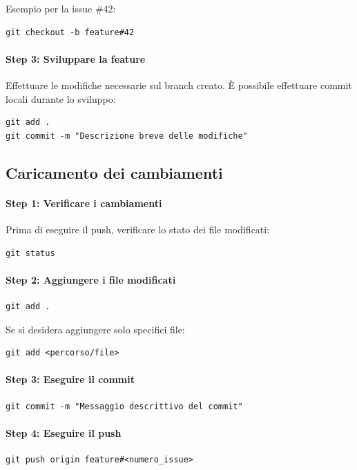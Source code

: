 Esempio per la issue \#42:
\begin{verbatim}
git checkout -b feature#42
\end{verbatim}

\paragraph{Step 3: Sviluppare la feature}
Effettuare le modifiche necessarie sul branch creato. È possibile effettuare commit locali durante lo sviluppo:

\begin{verbatim}
git add .
git commit -m "Descrizione breve delle modifiche"
\end{verbatim}

\subsection{Caricamento dei cambiamenti}

\paragraph{Step 1: Verificare i cambiamenti}
Prima di eseguire il push, verificare lo stato dei file modificati:

\begin{verbatim}
git status
\end{verbatim}

\paragraph{Step 2: Aggiungere i file modificati}
\begin{verbatim}
git add .
\end{verbatim}

Se si desidera aggiungere solo specifici file:
\begin{verbatim}
git add <percorso/file>
\end{verbatim}

\paragraph{Step 3: Eseguire il commit}
\begin{verbatim}
git commit -m "Messaggio descrittivo del commit"
\end{verbatim}

\paragraph{Step 4: Eseguire il push}
\begin{verbatim}
git push origin feature#<numero_issue>
\end{verbatim}


